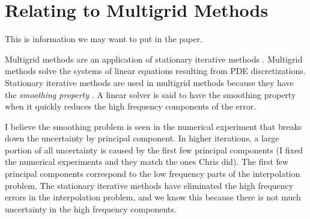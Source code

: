 \documentclass{article}
\begin{document}
\section{Relating to Multigrid Methods}

This is information we may want to put in the paper.

Multigrid methods are an application of stationary iterative methods \cite[Chapter 13]{Saad} \cite{BM87}. Multigrid methods solve the systems of linear equations resulting from PDE discretizations. Stationary iterative methods are used in multigrid methods because they have the \emph{smoothing property} \cite[Section 1.3]{BM87}. A linear solver is said to have the smoothing property when it quickly reduces the high frequency components of the error.

I believe the smoothing problem is seen in the numerical experiment that breaks down the uncertainty by principal component. In higher iterations, a large portion of all uncertainty is caused by the first few principal components (I fixed the numerical experiments and they match the ones Chris did). The first few principal components correspond to the low frequency parts of the interpolation problem. The stationary iterative methods have eliminated the high frequency errors in the interpolation problem, and we know this because there is not much uncertainty in the high frequency components.




\end{document}
